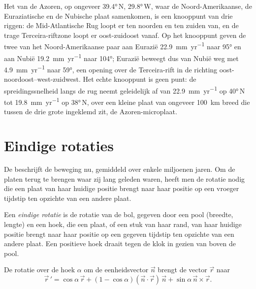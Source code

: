 Het  van de Azoren, op ongeveer \ang{39.4}\,N, \ang{29.8}\,W, waar de Noord-Amerikaanse, de Euraziatische en de Nubische plaat samenkomen, is een knooppunt van drie riggen: de Mid-Atlantische Rug loopt er ten noorden en ten zuiden van, en de trage Terceira-riftzone loopt er oost-zuidoost vanaf. Op het knooppunt geven de twee  van het Noord-Amerikaanse paar aan Eurazië \qty{22.9}{mm.yr^{-1}} naar \ang{95} en aan Nubië \qty{19.2}{mm.yr^{-1}} naar \ang{104}; Eurazië beweegt dus van Nubië weg met \qty{4.9}{mm.yr^{-1}} naar \ang{59}, een opening over de Terceira-rift in de richting oost-noordoost–west-zuidwest. Het echte knooppunt is geen punt: de spreidingssnelheid langs de rug neemt geleidelijk af van \qty{22.9}{mm.yr^{-1}} op \ang{40}\,N tot \qty{19.8}{mm.yr^{-1}} op \ang{38}\,N, over een kleine plaat van ongeveer \qty{100}{km} breed die tussen de drie grote ingeklemd zit, de Azoren-microplaat.

\section{Eindige rotaties}

De  beschrijft de beweging nu, gemiddeld over enkele miljoenen jaren. Om de platen terug te brengen waar zij lang geleden waren, heeft men de rotatie nodig die een plaat van haar huidige positie brengt naar haar positie op een vroeger tijdstip ten opzichte van een andere plaat.

\begin{definition}\label{def:b1:plate-kinematics:finite-rotation}
Een \emph{eindige rotatie} is de rotatie van de bol, gegeven door een pool (breedte, lengte) en een hoek, die een plaat, of een stuk van haar rand, van haar huidige positie brengt naar haar positie op een gegeven tijdstip ten opzichte van een andere plaat. Een positieve hoek draait tegen de klok in gezien van boven de pool.
\end{definition}

\begin{proposition}\label{prop:b1:plate-kinematics:rodrigues}
De rotatie over de hoek $\alpha$ om de eenheidsvector $\vec n$ brengt de vector $\vec r$ naar
\[
  \vec r\,' = \cos\alpha\,\vec r + (1 - \cos\alpha)(\vec n\cdot\vec r)\,\vec n
  + \sin\alpha\,\vec n\times\vec r .
\]
\end{proposition}

